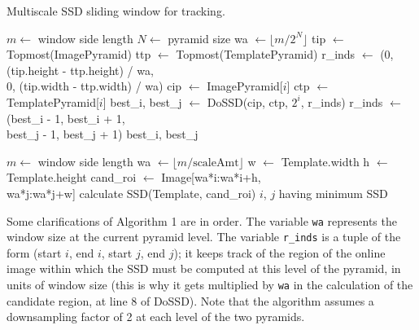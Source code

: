 \documentclass[10pt,twocolumn,letterpaper]{article}
\begin{document}
\begin{algorithm}
 \caption{Multiscale SSD sliding window for tracking.}
 \begin{algorithmic}[1]
  \State $m \leftarrow$ window side length
  \State $N \leftarrow$ pyramid size
  \State wa $\leftarrow \lfloor m / 2^{N} \rfloor$
  \State tip $\leftarrow$ Topmost(ImagePyramid)
  \State ttp $\leftarrow$ Topmost(TemplatePyramid)
  \State r\_inds $\leftarrow$ (0, (tip.height - ttp.height) / wa,\\\hspace{57pt}0, (tip.width - ttp.width) / wa)
     \State cip $\leftarrow$ ImagePyramid[$i$]
     \State ctp $\leftarrow$ TemplatePyramid[$i$]
     \State best\_i, best\_j $\leftarrow$ DoSSD(cip, ctp, $2^{i}$, r\_inds)
     \State r\_inds $\leftarrow$ (best\_i - 1, best\_i + 1,\\\hspace{73pt}best\_j - 1, best\_j + 1)
  \EndFor
  \State \Return best\_i, best\_j
  \EndProcedure
 \end{algorithmic}
  \begin{algorithmic}[1]
  \State $m \leftarrow$ window side length
  \State wa $\leftarrow \lfloor m / \text{scaleAmt} \rfloor$
  \State w $\leftarrow$ Template.width
  \State h $\leftarrow$ Template.height
    \State cand\_roi $\leftarrow$ Image[wa*i:wa*i+h,\\\hspace{122pt}wa*j:wa*j+w]
    \State calculate SSD(Template, cand\_roi)
    \EndFor
  \EndFor
  \State \Return $i$, $j$ having minimum SSD
  \EndProcedure
 \end{algorithmic}
\end{algorithm}

Some clarifications of Algorithm 1 are in order. The variable \texttt{wa}
represents the window size at the current pyramid level. The variable \texttt{r\_inds}
is a tuple of the form (start $i$, end $i$, start $j$, end $j$); it keeps
track of the region of the online image within which the SSD must be computed
at this level of the pyramid, in units of window size (this is why it gets
multiplied by \texttt{wa} in the calculation of the candidate region, at line 8 of
DoSSD). Note that the algorithm assumes a downsampling factor of 2 at each level
of the two pyramids.
\end{document}
